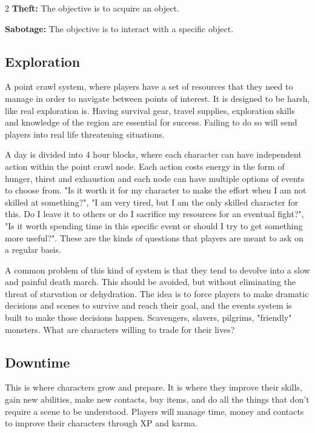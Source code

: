 \begin{multicols}{2}
\textbf{Theft:} The objective is to acquire an object. 

\textbf{Sabotage:} The objective is to interact with a specific object. 

\subsection{Exploration} 

A point crawl system, where players have a set of resources that they need to manage in order to navigate between points of interest. It is designed to be harsh, like real exploration is. Having survival gear, travel supplies, exploration skills and knowledge of the region are essential for success. Failing to do so will send players into real life threatening situations. 

A day is divided into 4 hour blocks, where each character can have independent action within the point crawl node. Each action costs energy in the form of hunger, thirst and exhaustion and each node can have multiple options of events to choose from. "Is it worth it for my character to make the effort when I am not skilled at something?", "I am very tired, but I am the only skilled character for this. Do I leave it to others or do I sacrifice my resources for an eventual fight?", "Is it worth spending time in this specific event or should I try to get something more useful?". These are the kinds of questions that players are meant to ask on a regular basis.

A common problem of this kind of system is that they tend to devolve into a slow and painful death march. This should be avoided, but without eliminating the threat of starvation or dehydration. The idea is to force players to make dramatic decisions and scenes to survive and reach their goal, and the events system is built to make those decisions happen. Scavengers, slavers, pilgrims, "friendly" monsters. What are characters willing to trade for their lives? 


\subsection{Downtime} 

This is where characters grow and prepare. It is where they improve their skills, gain new abilities, make new contacts, buy items, and do all the things that don't require a scene to be understood. Players will manage time, money and contacts to improve their characters through XP and karma.

\end{multicols}


